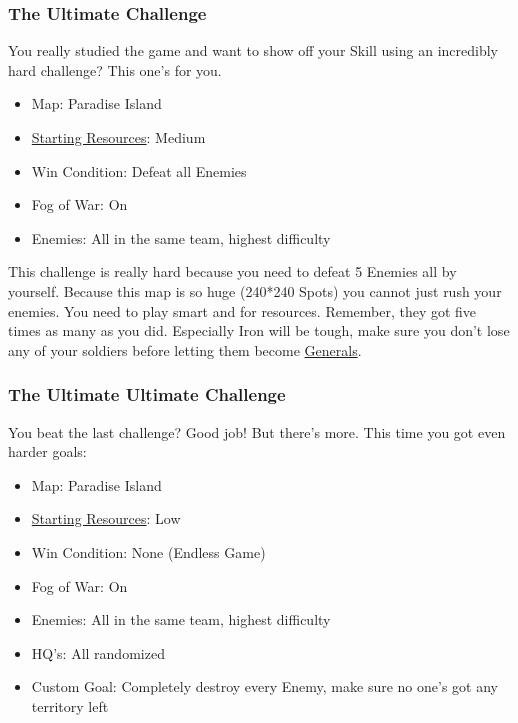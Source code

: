 \documentclass[12pt]{article}
\begin{document}
\subsubsection{The Ultimate Challenge}
\label{sec:challenge_ultimate}

You really studied the game and want to show off your Skill using an incredibly hard challenge? This one's for you.

\begin{itemize}
  \item Map: Paradise Island
  \item \hyperref[sec:startingresources]{Starting Resources}: Medium
  \item Win Condition: Defeat all Enemies
  \item Fog of War: On
  \item Enemies: All in the same team, highest difficulty
\end{itemize}

This challenge is really hard because you need to defeat 5 Enemies all by yourself. Because this map is so huge (240*240 Spots) you cannot just rush your enemies. You need to play smart and for resources. Remember, they got five times as many as you did. Especially Iron will be tough, make sure you don't lose any of your soldiers before letting them become \hyperref[sec:general]{Generals}.

\subsubsection{The Ultimate Ultimate Challenge}
\label{sec:challenge_ultimate_ultimate}

You beat the last challenge? Good job! But there's more. This time you got even harder goals:

\begin{itemize}
  \item Map: Paradise Island
  \item \hyperref[sec:startingresources]{Starting Resources}: Low
  \item Win Condition: None (Endless Game)
  \item Fog of War: On
  \item Enemies: All in the same team, highest difficulty
  \item HQ's: All randomized
  \item Custom Goal: Completely destroy every Enemy, make sure no one's got any territory left
\end{itemize}
\end{document}
